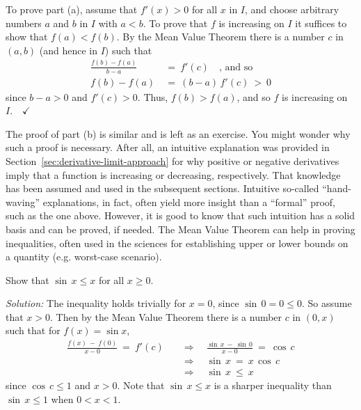 To prove part (a), assume that $f'(x) > 0$ for all $x$ in $I$, and choose
arbitrary numbers $a$ and $b$ in $I$ with $a < b$. To prove that $f$ is
increasing on $I$ it suffices to show that $f(a) < f(b)$. By the Mean Value
Theorem there is a number $c$ in $(a,b)$ (and hence in $I$) such that
\begin{align*}
\frac{f(b) - f(a)}{b - a} ~&=~ f'(c) \quad\text{, and so}\\[6pt]
f(b) - f(a) ~&=~ (b-a)\,f'(c) ~>~ 0
\end{align*}
since $b-a>0$ and $f'(c)>0$. Thus, $f(b) > f(a)$, and so $f$ is increasing on
$I.\quad\checkmark$

The proof of part (b) is similar and is left as an exercise. 
You might wonder why such a proof is necessary. After all, an intuitive
explanation was provided in Section~\ref{sec:derivative-limit-approach} for why positive or negative derivatives
imply that a function is increasing or decreasing, respectively. That knowledge
has been assumed and used in the subsequent sections. Intuitive so-called
``hand-waving'' explanations, in fact, often yield more insight than a
``formal'' proof, such as the one above. However, it is good to know that such
intuition has a solid basis and can be proved, if needed.
\newpage
The Mean Value Theorem can help in proving inequalities, often used in the
sciences for establishing upper or lower bounds on a quantity (e.g. worst-case
scenario).

\begin{exmp}\label{exmp:ineq1}
\noindent Show that $\sin\,x \le x$ for all $x \ge 0$.\vspace{1mm}
\par\noindent\emph{Solution:} The inequality holds trivially for $x=0$, since
$\sin\,0 = 0 \le 0$. So assume that $x > 0$. Then by the Mean Value Theorem
there is a number $c$ in $(0,x)$ such that for $f(x)=\sin x$,
\begin{align*}
\frac{f(x) ~-~ f(0)}{x - 0} ~=~ f'(c) \quad&\Rightarrow\quad
\frac{\sin\,x ~-~ \sin\,0}{x - 0} ~=~ \cos\,c\\[6pt]
&\Rightarrow\quad \sin\,x ~=~ x\,\cos\,c\\
&\Rightarrow\quad \sin\,x ~\le~ x
\end{align*}
since $\cos\,c \le 1$ and $x > 0$. Note that $\sin\,x \le x$ is a sharper
inequality than $\sin\,x \le 1$ when $0 < x < 1$.
\end{exmp}
\divider
\vspace{2mm}


